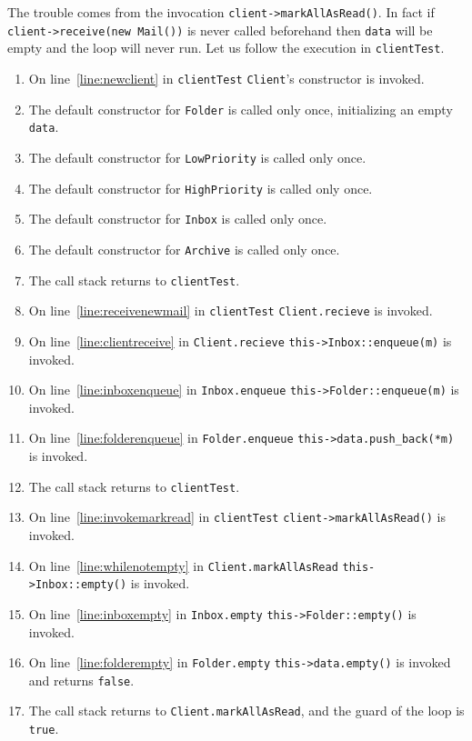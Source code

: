 \documentclass{article}
\begin{document}
\begin{example}
  The trouble comes from the invocation \texttt{client->markAllAsRead()}.
  In fact if \texttt{client->receive(new Mail())} is never called beforehand then \texttt{data} will be empty and the loop will never run.
  Let us follow the execution in \texttt{clientTest}.
  \begin{enumerate}
  \item On line~\ref{line:newclient} in \texttt{clientTest} \texttt{Client}'s constructor is invoked.
  \item The default constructor for \texttt{Folder} is called only once, initializing an empty \texttt{data}.
  \item The default constructor for \texttt{LowPriority} is called only once.
  \item The default constructor for \texttt{HighPriority} is called only once.
  \item The default constructor for \texttt{Inbox} is called only once.
  \item The default constructor for \texttt{Archive} is called only once.
  \item The call stack returns to \texttt{clientTest}.
  \item On line~\ref{line:receivenewmail} in \texttt{clientTest} \texttt{Client.recieve} is invoked.
  \item On line~\ref{line:clientreceive} in \texttt{Client.recieve} \texttt{this->Inbox::enqueue(m)} is invoked.
  \item On line~\ref{line:inboxenqueue} in \texttt{Inbox.enqueue} \texttt{this->Folder::enqueue(m)} is invoked.
  \item On line~\ref{line:folderenqueue} in \texttt{Folder.enqueue} \texttt{this->data.push\_back(*m)} is invoked.
  \item The call stack returns to \texttt{clientTest}.
  \item On line~\ref{line:invokemarkread} in \texttt{clientTest} \texttt{client->markAllAsRead()} is invoked.
  \item On line~\ref{line:whilenotempty} in \texttt{Client.markAllAsRead} \texttt{this->Inbox::empty()} is invoked.
  \item On line~\ref{line:inboxempty} in \texttt{Inbox.empty} \texttt{this->Folder::empty()} is invoked.
  \item On line~\ref{line:folderempty} in \texttt{Folder.empty} \texttt{this->data.empty()} is invoked and returns \texttt{false}.
  \item The call stack returns to \texttt{Client.markAllAsRead}, and the guard of the loop is \texttt{true}.

\end{enumerate}
\end{example}
\end{document}
